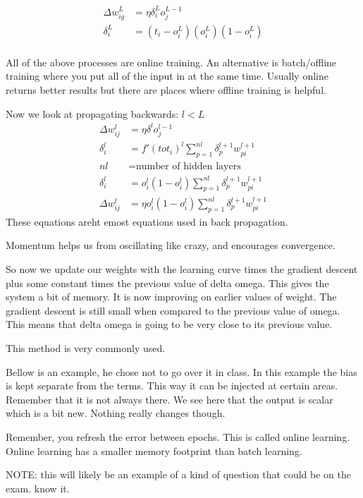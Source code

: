 \documentclass{article}
\begin{document}
\begin{align*}
	\Delta w_{ig}^L &= \eta \delta_i^L o_j^{L-1}\\
	\delta_i^L &= (t_i - o_i^L)(o_i^L)(1-o_i^L)\\
\end{align*}


All of the above processes are online training. An alternative is batch/offline training where you put all of the input in at the same time. Usually online returns better results but there are places where offline training is helpful.

Now we look at propagating backwards: $l < L$
\begin{align*}
	\Delta w_{ij}^l &= \eta \delta^lo_j^{l-1}\\
	\delta_i^l &= f'(tot_i)^l \sum_{p=1}^{nl} \delta_p^{l+1}w_{pi}^{l+1}\\
	nl &= \text{number of hidden layers}\\
	\delta_i^l &= o_i^l(1-o_i^l)\sum_{p=1}^{nl} \delta_p^{l+1}w_{pi}^{l+1}\\
	\Delta w_{ij}^l &= \eta o_i^l(1-o_i^l) \sum_{p=1}^{nl} \delta_p^{l+1}w_{pi}^{l+1}
\end{align*}
These equations areht emost equations used in back propagation.


Momentum helps us from oscillating like crazy, and encourages convergence.

So now we update our weights with the learning curve times the gradient descent plus some constant times the previous value of delta omega. This gives the system a bit of memory. It is now improving on earlier values of weight. The gradient descent is still small when compared to the previous value of omega. This means that delta omega is going to be very close to its previous value.

This method is very commonly used.

Bellow is an example, he chose not to go over it in class. In this example the bias is kept separate from the terms. This way it can be injected at certain areas. Remember that it is not always there. We see here that the output is scalar which is a bit new. Nothing really changes though.

Remember, you refresh the error between epochs. This is called online learning. Online learning has a smaller memory footprint than batch learning.

NOTE: this will likely be an example of a kind of question that could be on the exam. know it.

\end{document}
